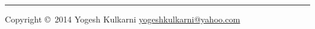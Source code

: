 


\raggedright
\footnotesize

\begin{multicols}{3}


\pagebreak


\rule{0.3\linewidth}{0.25pt}
\scriptsize
Copyright \copyright\ 2014 Yogesh Kulkarni
\href{http://www.yogeshkulkarni.com}{yogeshkulkarni@yahoo.com}

\end{multicols}

